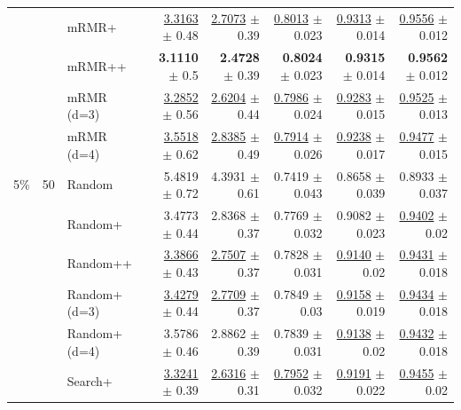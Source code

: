 \begin{longtable}{llp{}rrrrr}
 &  & mRMR+ & \underline{3.3163} {\scriptsize $\pm$ 0.48} & \underline{2.7073} {\scriptsize $\pm$ 0.39} & \underline{0.8013} {\scriptsize $\pm$ 0.023} & \underline{0.9313} {\scriptsize $\pm$ 0.014} & \underline{0.9556} {\scriptsize $\pm$ 0.012} \\
 &  & mRMR++ & \textbf{3.1110} {\scriptsize $\pm$ 0.5} & \textbf{2.4728} {\scriptsize $\pm$ 0.39} & \textbf{0.8024} {\scriptsize $\pm$ 0.023} & \textbf{0.9315} {\scriptsize $\pm$ 0.014} & \textbf{0.9562} {\scriptsize $\pm$ 0.012} \\
 &  & mRMR (d=3) & \underline{3.2852} {\scriptsize $\pm$ 0.56} & \underline{2.6204} {\scriptsize $\pm$ 0.44} & \underline{0.7986} {\scriptsize $\pm$ 0.024} & \underline{0.9283} {\scriptsize $\pm$ 0.015} & \underline{0.9525} {\scriptsize $\pm$ 0.013} \\
 &  & mRMR (d=4) & \underline{3.5518} {\scriptsize $\pm$ 0.62} & \underline{2.8385} {\scriptsize $\pm$ 0.49} & \underline{0.7914} {\scriptsize $\pm$ 0.026} & \underline{0.9238} {\scriptsize $\pm$ 0.017} & \underline{0.9477} {\scriptsize $\pm$ 0.015} \\
\midrule
5\% & 50 & Random & 5.4819 {\scriptsize $\pm$ 0.72} & 4.3931 {\scriptsize $\pm$ 0.61} & 0.7419 {\scriptsize $\pm$ 0.043} & 0.8658 {\scriptsize $\pm$ 0.039} & 0.8933 {\scriptsize $\pm$ 0.037} \\
 &  & Random+ & 3.4773 {\scriptsize $\pm$ 0.44} & 2.8368 {\scriptsize $\pm$ 0.37} & 0.7769 {\scriptsize $\pm$ 0.032} & 0.9082 {\scriptsize $\pm$ 0.023} & \underline{0.9402} {\scriptsize $\pm$ 0.02} \\
 &  & Random++ & \underline{3.3866} {\scriptsize $\pm$ 0.43} & \underline{2.7507} {\scriptsize $\pm$ 0.37} & 0.7828 {\scriptsize $\pm$ 0.031} & \underline{0.9140} {\scriptsize $\pm$ 0.02} & \underline{0.9431} {\scriptsize $\pm$ 0.018} \\
 &  & Random+ (d=3) & \underline{3.4279} {\scriptsize $\pm$ 0.44} & \underline{2.7709} {\scriptsize $\pm$ 0.37} & 0.7849 {\scriptsize $\pm$ 0.03} & \underline{0.9158} {\scriptsize $\pm$ 0.019} & \underline{0.9434} {\scriptsize $\pm$ 0.018} \\
 &  & Random+ (d=4) & 3.5786 {\scriptsize $\pm$ 0.46} & 2.8862 {\scriptsize $\pm$ 0.39} & 0.7839 {\scriptsize $\pm$ 0.031} & \underline{0.9138} {\scriptsize $\pm$ 0.02} & \underline{0.9432} {\scriptsize $\pm$ 0.018} \\
 &  & Search+ & \underline{3.3241} {\scriptsize $\pm$ 0.39} & \underline{2.6316} {\scriptsize $\pm$ 0.31} & \underline{0.7952} {\scriptsize $\pm$ 0.032} & \underline{0.9191} {\scriptsize $\pm$ 0.022} & \underline{0.9455} {\scriptsize $\pm$ 0.02} \\

\end{longtable}
